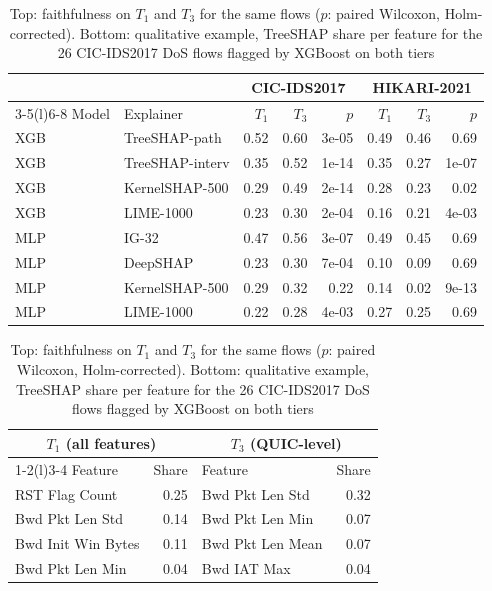 \documentclass[pdflatex,iicol,sn-mathphys-num]{sn-jnl}
\begin{document}
\begin{table}[!t]
\caption{Top: faithfulness on $T_1$ and $T_3$ for the same flows ($p$: paired Wilcoxon, Holm-corrected). Bottom: qualitative example, TreeSHAP share per feature for the 26 CIC-IDS2017 DoS flows flagged by XGBoost on both tiers}\label{tab:tier}
\setlength{\tabcolsep}{2pt}
\begin{tabular*}{\columnwidth}{@{\extracolsep\fill}llrrrrrr@{}}
\toprule
 & & \multicolumn{3}{c}{CIC-IDS2017} & \multicolumn{3}{c}{HIKARI-2021} \\
\cmidrule(lr){3-5}\cmidrule(l){6-8}
Model & Explainer & $T_1$ & $T_3$ & $p$ & $T_1$ & $T_3$ & $p$ \\
\midrule
XGB & TreeSHAP-path & 0.52 & 0.60 & 3e-05 & 0.49 & 0.46 & 0.69 \\
XGB & TreeSHAP-interv & 0.35 & 0.52 & 1e-14 & 0.35 & 0.27 & 1e-07 \\
XGB & KernelSHAP-500 & 0.29 & 0.49 & 2e-14 & 0.28 & 0.23 & 0.02 \\
XGB & LIME-1000 & 0.23 & 0.30 & 2e-04 & 0.16 & 0.21 & 4e-03 \\
MLP & IG-32 & 0.47 & 0.56 & 3e-07 & 0.49 & 0.45 & 0.69 \\
MLP & DeepSHAP & 0.23 & 0.30 & 7e-04 & 0.10 & 0.09 & 0.69 \\
MLP & KernelSHAP-500 & 0.29 & 0.32 & 0.22 & 0.14 & 0.02 & 9e-13 \\
MLP & LIME-1000 & 0.22 & 0.28 & 4e-03 & 0.27 & 0.25 & 0.69 \\
\bottomrule
\end{tabular*}

\vspace{6pt}
\begin{tabular*}{\columnwidth}{@{\extracolsep\fill}lrlr@{}}
\toprule
\multicolumn{2}{c}{$T_1$ (all features)} & \multicolumn{2}{c}{$T_3$ (QUIC-level)} \\
\cmidrule(r){1-2}\cmidrule(l){3-4}
Feature & Share & Feature & Share \\
\midrule
RST Flag Count & 0.25 & Bwd Pkt Len Std & 0.32 \\
Bwd Pkt Len Std & 0.14 & Bwd Pkt Len Min & 0.07 \\
Bwd Init Win Bytes & 0.11 & Bwd Pkt Len Mean & 0.07 \\
Bwd Pkt Len Min & 0.04 & Bwd IAT Max & 0.04 \\
\bottomrule
\end{tabular*}
\end{table}
\end{document}
